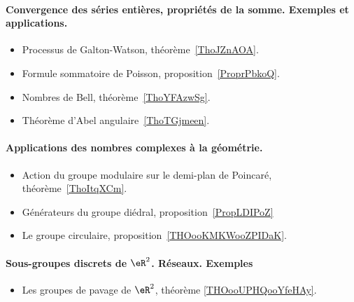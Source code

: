 \paragraph{Convergence des séries entières, propriétés de la somme. Exemples et applications.}
\begin{itemize}
	\item Processus de Galton-Watson, théorème~\ref{ThoJZnAOA}.
	\item Formule sommatoire de Poisson, proposition~\ref{ProprPbkoQ}.
	\item Nombres de Bell, théorème~\ref{ThoYFAzwSg}.
	\item Théorème d'Abel angulaire~\ref{ThoTGjmeen}.
\end{itemize}
\paragraph{Applications des nombres complexes à la géométrie.}
\begin{itemize}
	\item Action du groupe modulaire sur le demi-plan de Poincaré, théorème~\ref{ThoItqXCm}.
	\item Générateurs du groupe diédral, proposition~\ref{PropLDIPoZ}
	\item Le groupe circulaire, proposition~\ref{THOooKMKWooZPIDaK}.
\end{itemize}
\paragraph{Sous-groupes discrets de \( \eR^2\). Réseaux. Exemples}
\begin{itemize}
	\item Les groupes de pavage de \( \eR^2\), théorème \ref{THOooUPHQooYfeHAy}.
\end{itemize}
